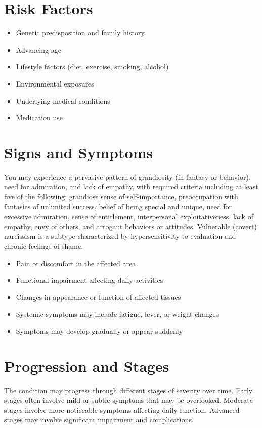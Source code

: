 \section{Risk Factors}
\begin{itemize}[noitemsep]
  \item Genetic predisposition and family history
  \item Advancing age
  \item Lifestyle factors (diet, exercise, smoking, alcohol)
  \item Environmental exposures
  \item Underlying medical conditions
  \item Medication use
\end{itemize}
\section{Signs and Symptoms}
You may experience a pervasive pattern of grandiosity (in fantasy or behavior), need for admiration, and lack of empathy, with required criteria including at least five of the following: grandiose sense of self-importance, preoccupation with fantasies of unlimited success, belief of being special and unique, need for excessive admiration, sense of entitlement, interpersonal exploitativeness, lack of empathy, envy of others, and arrogant behaviors or attitudes. Vulnerable (covert) narcissism is a subtype characterized by hypersensitivity to evaluation and chronic feelings of shame.

\begin{itemize}[noitemsep]
  \item Pain or discomfort in the affected area
  \item Functional impairment affecting daily activities
  \item Changes in appearance or function of affected tissues
  \item Systemic symptoms may include fatigue, fever, or weight changes
  \item Symptoms may develop gradually or appear suddenly
\end{itemize}
\section{Progression and Stages}
The condition may progress through different stages of severity over time. Early stages often involve mild or subtle symptoms that may be overlooked. Moderate stages involve more noticeable symptoms affecting daily function. Advanced stages may involve significant impairment and complications.

